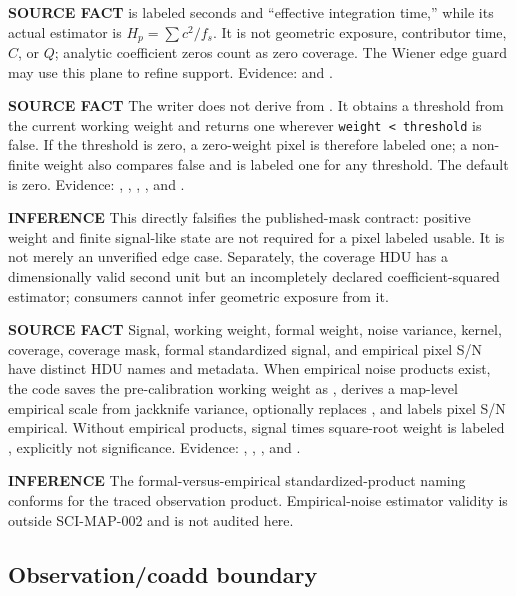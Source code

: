\documentclass[10pt]{article}
\newcommand{\packageid}{SCI-MAP-002}
\newcommand{\srclabel}{\textbf{SOURCE FACT}}
\newcommand{\inflabel}{\textbf{INFERENCE}}
\begin{document}
\srclabel{}  is labeled seconds and ``effective integration
time,'' while its actual estimator is $H_p=\sum c^2/f_s$.  It is not geometric
exposure, contributor time, $C$, or $Q$; analytic coefficient zeros count as
zero coverage.  The Wiener edge guard may use this plane to refine support.
Evidence:  and
.

\srclabel{} The writer does not derive  from
.  It obtains a threshold from the current working weight
and returns one wherever \texttt{weight < threshold} is false.  If the
threshold is zero, a zero-weight pixel is therefore labeled one; a non-finite
weight also compares false and is labeled one for any threshold.  The default
 is zero.  Evidence:
,
,
, , and
.

\inflabel{} This directly falsifies the published-mask contract: positive
weight and finite signal-like state are not required for a pixel labeled
usable.  It is not merely an unverified edge case.  Separately, the coverage
HDU has a dimensionally valid second unit but an incompletely declared
coefficient-squared estimator; consumers cannot infer geometric exposure from
it.

\srclabel{} Signal, working weight, formal weight, noise variance, kernel,
coverage, coverage mask, formal standardized signal, and empirical pixel S/N
have distinct HDU names and metadata.  When empirical noise products exist,
the code saves the pre-calibration working weight as ,
derives a map-level empirical scale from jackknife variance, optionally
replaces , and labels pixel S/N empirical.  Without empirical
products, signal times square-root weight is labeled
, explicitly not significance.
Evidence: ,
,
, and
.

\inflabel{} The formal-versus-empirical standardized-product naming conforms
for the traced observation product.  Empirical-noise estimator validity is
outside \packageid{} and is not audited here.

\subsection{Observation/coadd boundary}
\end{document}
